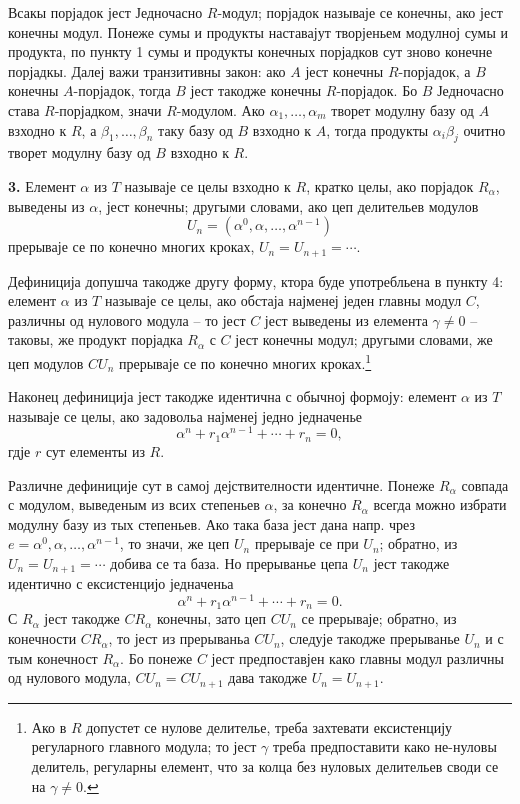 ﻿\documentclass[11pt]{article}
\begin{document}
Всакы порјадок јест Једночасно $R$-модул; порјадок называје се конечны, ако јест конечны модул. Понеже сумы и продукты наставајут творјеньем модулној сумы и продукта, по пункту 1 сумы и продукты конечных порјадков сут зново конечне порјадкы. Далеј важи транзитивны закон: ако $A$ јест конечны $R$-порјадок, а $B$ конечны $A$-порјадок, тогда $B$ јест такодже конечны $R$-порјадок. Бо $B$ Једночасно става $R$-порјадком, значи $R$-модулом. Ако $\alpha_1,\ldots,\alpha_m$ творет модулну базу од $A$ взходно к $R$, а $\beta_1,\ldots,\beta_n$ таку базу од $B$ взходно к $A$, тогда продукты $\alpha_i\beta_j$ очитно творет модулну базу од $B$ взходно к $R$.

\textbf{3.} Елемент $\alpha$ из $T$ называје се целы взходно к $R$, кратко целы, ако порјадок $R_\alpha$, выведены из $\alpha$, јест конечны; другыми словами, ако цеп делительев модулов
\[
        U_n=(\alpha^0,\alpha,\ldots,\alpha^{n-1})
\]
прерываје се по конечно многих кроках, $U_n=U_{n+1}=\cdots$.

Дефиниција допушча такодже другу форму, ктора буде употребльена в пункту 4: елемент $\alpha$ из $T$ называје се целы, ако обстаја најменеј једен главны модул $C$, различны од нулового модула -- то јест $C$ јест выведены из елемента $\gamma\ne0$ -- таковы, же продукт порјадка $R_\alpha$ с $C$ јест конечны модул; другыми словами, же цеп модулов $CU_n$ прерываје се по конечно многих кроках.\footnote{Ако в $R$ допустет се нулове делителье, треба захтевати ексистенцију регуларного главного модула; то јест $\gamma$ треба предпоставити како не-нуловы делитель, регуларны елемент, что за колца без нуловых делительев своди се на $\gamma\ne0$.}

Наконец дефиниција јест такодже идентична с обычној формоју: елемент $\alpha$ из $T$ называје се целы, ако задовольа најменеј једно једначенье
\[
        \alpha^n+r_1\alpha^{n-1}+\cdots+r_n=0,
\]
гдје $r$ сут елементы из $R$.

Различне дефиниције сут в самој дејствителности идентичне. Понеже $R_\alpha$ совпада с модулом, выведеным из всих степеньев $\alpha$, за конечно $R_\alpha$ всегда можно избрати модулну базу из тых степеньев. Ако така база јест дана напр. чрез $e=\alpha^0,\alpha,\ldots,\alpha^{n-1}$, то значи, же цеп $U_n$ прерываје се при $U_n$; обратно, из $U_n=U_{n+1}=\cdots$ добива се та база. Но прерыванье цепа $U_n$ јест такодже идентично с ексистенцијо једначеньа
\[
        \alpha^n+r_1\alpha^{n-1}+\cdots+r_n=0.
\]
С $R_\alpha$ јест такодже $CR_\alpha$ конечны, зато цеп $CU_n$ се прерываје; обратно, из конечности $CR_\alpha$, то јест из прерываньа $CU_n$, следује такодже прерыванье $U_n$ и с тым конечност $R_\alpha$. Бо понеже $C$ јест предпоставјен како главны модул различны од нулового модула, $CU_n=CU_{n+1}$ дава такодже $U_n=U_{n+1}$.
\end{document}
